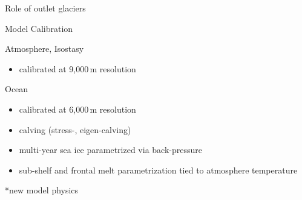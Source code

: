 \documentclass[shownotes notes,intlimits]{beamer}
\begin{document}
\begin{frame}{Role of outlet glaciers}

\end{frame}

\begin{frame}{Model Calibration}
  \begin{block}{Atmosphere, Isostasy}
    \begin{itemize}
    \item calibrated at 9,000\,m resolution
    \end{itemize}
  \end{block}
  \begin{block}{Ocean}
    \begin{itemize}
    \item calibrated at 6,000\,m resolution
    \item calving (\alert{stress}-, eigen-calving)
    \item \alert{multi-year sea ice parametrized via back-pressure}
    \item \alert{sub-shelf and frontal melt} parametrization tied to atmosphere temperature
    \end{itemize}
  \end{block}
    \alert{*new model physics}
\end{frame}
\end{document}

